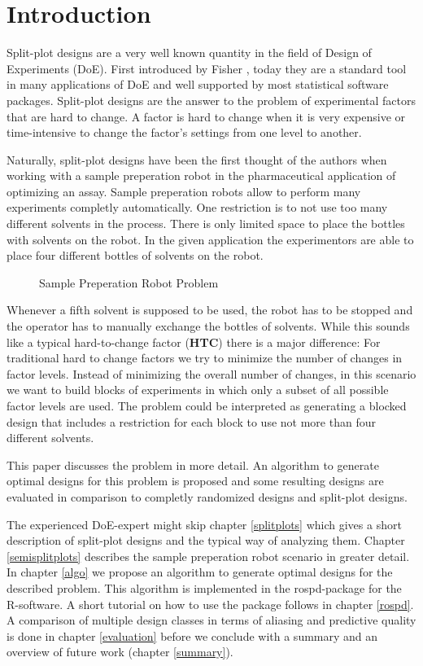 \section{Introduction} \label{intro}

Split-plot designs are a very well known quantity in the field of Design of Experiments (DoE). First introduced by Fisher \cite{Fisher1992}, today they are a standard tool in many applications of DoE and well supported by most statistical software packages. Split-plot designs are the answer to the problem of experimental factors that are hard to change. A factor is hard to change when it is very expensive or time-intensive to change the factor's settings from one level to another. 

Naturally, split-plot designs have been the first thought of the authors when working with a sample preperation robot in the pharmaceutical application of optimizing an assay. Sample preperation robots allow to perform many experiments completly automatically. One restriction is to not use too many different solvents in the process. There is only limited space to place the bottles with solvents on the robot. In the given application the experimentors are able to place four different bottles of solvents on the robot.

\begin{figure}[!h]
	\caption{Sample Preperation Robot Problem}
\end{figure}

Whenever a fifth solvent is supposed to be used, the robot has to be stopped and the operator has to manually exchange the bottles of solvents. While this sounds like a typical hard-to-change factor (\textbf{HTC}) there is a major difference: For traditional hard to change factors we try to minimize the number of changes in factor levels. Instead of minimizing the overall number of changes, in this scenario we want to build blocks of experiments in which only a subset of all possible factor levels are used. The problem could be interpreted as generating a blocked design that includes a restriction for each block to use not more than four different solvents.

This paper discusses the problem in more detail. An algorithm to generate optimal designs for this problem is proposed and some resulting designs are evaluated in comparison to completly randomized designs and split-plot designs.

The experienced DoE-expert might skip chapter \ref{splitplots} which gives a short description of split-plot designs and the typical way of analyzing them. Chapter \ref{semisplitplots} describes the sample preperation robot scenario in greater detail. In chapter \ref{algo} we propose an algorithm to generate optimal designs for the described problem. This algorithm is implemented in the rospd-package for the R-software. A short tutorial on how to use the package follows in chapter \ref{rospd}. A comparison of multiple design classes in terms of aliasing and predictive quality is done in chapter \ref{evaluation} before we conclude with a summary and an overview of future work (chapter \ref{summary}).